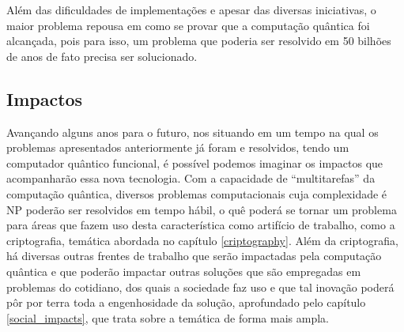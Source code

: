 Além das dificuldades de implementações e apesar das diversas iniciativas, o maior problema repousa em como se provar que a computação quântica foi alcançada, pois para isso, um problema que poderia ser resolvido em 50 bilhões de anos de fato precisa ser solucionado.

\subsection{Impactos}
Avançando alguns anos para o futuro, nos situando em um tempo na qual os problemas apresentados anteriormente já foram e resolvidos, tendo um computador quântico funcional, é possível podemos imaginar os impactos que acompanharão essa nova tecnologia. Com a capacidade de “multitarefas” da computação quântica, diversos problemas computacionais cuja complexidade é NP poderão ser resolvidos em tempo hábil, o quê poderá se tornar um problema para áreas que fazem uso desta característica como artifício de trabalho, como a criptografia, temática abordada no capítulo \ref{criptography}.
Além da criptografia, há diversas outras frentes de trabalho que serão impactadas pela computação quântica e que poderão impactar outras soluções que são empregadas em problemas do cotidiano, dos quais a sociedade faz uso e que tal inovação poderá pôr por terra toda a engenhosidade da solução, aprofundado pelo capítulo \ref{social_impacts}, que trata sobre a temática de forma mais ampla.


\newpage